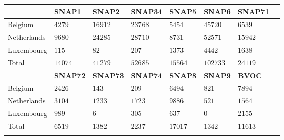 \begin{tabular}{llllllll}
    \hline \hline
    & \textbf{SNAP1} & \textbf{SNAP2} & \textbf{SNAP34} & \textbf{SNAP5} & \textbf{SNAP6} & \textbf{SNAP71} \\
    \hline
    Belgium     & $4279$ & $16912$  & $23768$   & $5454$ & $45720$ & $6539$ \\
    Netherlands & $9680$ & $24285$  & $28710$   & $8731$ & $52571$ & $15942$ \\
    Luxembourg  & $115$  & $82$     & $207$     & $1373$ & $4442$  & $1638$ \\
    \hline
    Total       & $14074$ & $41279$ & $52685$   & $15564$ & $102733$ & $24119$ \\
    \hline
    & \textbf{SNAP72} & \textbf{SNAP73} & \textbf{SNAP74} & \textbf{SNAP8} & \textbf{SNAP9} & \textbf{BVOC} \\
    \hline
    Belgium     & $2426$ & $143$  & $209$  & $6494$  & $821$  & $7894$ \\
    Netherlands & $3104$ & $1233$ & $1723$ & $9886$  & $521$  & $1564$ \\
    Luxembourg  & $989$  & $6$    & $305$  & $637$   & $0$    & $2155$ \\
    \hline
    Total       & $6519$ & $1382$ & $2237$ & $17017$ & $1342$ & $11613$ \\
    \hline \hline
    \label{t:NMVOC_emissions}%
\end{tabular}%
